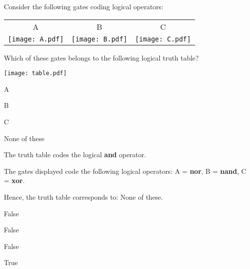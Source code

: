 
\begin{question}

Consider the following gates coding logical operators:

\begin{tabular}{ccc}
A & B & C\\

\texttt{[image: A.pdf]}
&

\texttt{[image: B.pdf]}
&

\texttt{[image: C.pdf]}
\end{tabular}

Which of these gates belongs to the following logical truth table?

\texttt{[image: table.pdf]}

\begin{answerlist}
  \item A
  \item B
  \item C
  \item None of these
\end{answerlist}
\end{question}


\begin{solution}

The truth table codes the logical \textbf{and} operator.

The gates displayed code the following logical operators:
A = \textbf{nor},
B = \textbf{nand},
C = \textbf{xor}.

Hence, the truth table corresponds to:
None of these.

\begin{answerlist}
  \item False
  \item False
  \item False
  \item True
\end{answerlist}
\end{solution}

